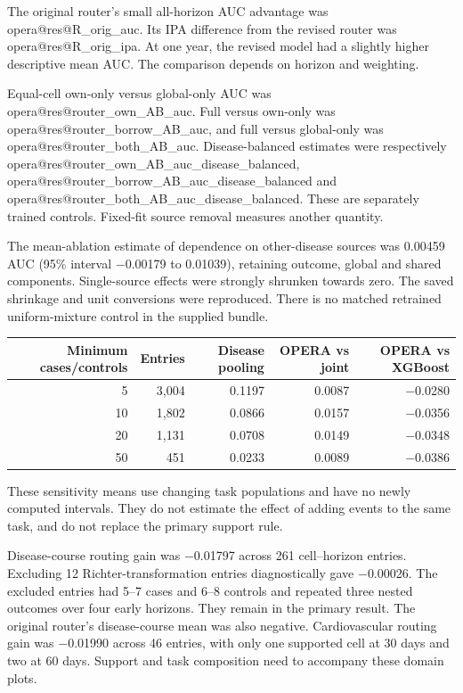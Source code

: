 \documentclass[11pt]{article}
\makeatletter
\newcommand{\result}[1]{\csname opera@res@#1\endcsname}
\makeatother
\begin{document}
The original router's small all-horizon AUC advantage was
\result{R_orig_auc}. Its IPA difference from the revised router was
\result{R_orig_ipa}. At one year, the revised model had a slightly higher
descriptive mean AUC. The comparison depends on horizon and weighting.

Equal-cell own-only versus global-only AUC was
\result{router_own_AB_auc}. Full versus own-only was
\result{router_borrow_AB_auc}, and full versus global-only was
\result{router_both_AB_auc}. Disease-balanced estimates were respectively
\result{router_own_AB_auc_disease_balanced},
\result{router_borrow_AB_auc_disease_balanced} and
\result{router_both_AB_auc_disease_balanced}. These are separately trained
controls. Fixed-fit source removal measures another quantity.

The mean-ablation estimate of dependence on other-disease sources was
0.00459 AUC (95\% interval $-$0.00179 to 0.01039), retaining outcome,
global and shared components. Single-source effects were strongly shrunken
towards zero. The saved shrinkage and unit conversions were reproduced.
There is no matched retrained uniform-mixture control in the supplied bundle.

\begin{center}\small
\begin{tabular}{rrrrr}\toprule
Minimum cases/controls & Entries & Disease pooling & OPERA vs joint & OPERA vs XGBoost\\\midrule
5 & 3,004 & 0.1197 & 0.0087 & $-$0.0280\\
10 & 1,802 & 0.0866 & 0.0157 & $-$0.0356\\
20 & 1,131 & 0.0708 & 0.0149 & $-$0.0348\\
50 & 451 & 0.0233 & 0.0089 & $-$0.0386\\\bottomrule
\end{tabular}\end{center}
These sensitivity means use changing task populations and have no newly
computed intervals. They do not estimate the effect of adding events to the
same task, and do not replace the primary support rule.

Disease-course routing gain was $-$0.01797 across 261 cell--horizon entries.
Excluding 12 Richter-transformation entries diagnostically gave $-$0.00026.
The excluded entries had 5--7 cases and 6--8 controls and repeated three
nested outcomes over four early horizons. They remain in the primary result.
The original router's disease-course mean was also negative. Cardiovascular
routing gain was $-$0.01990 across 46 entries, with only one supported cell at
30 days and two at 60 days. Support and task composition need to accompany
these domain plots.
\end{document}

